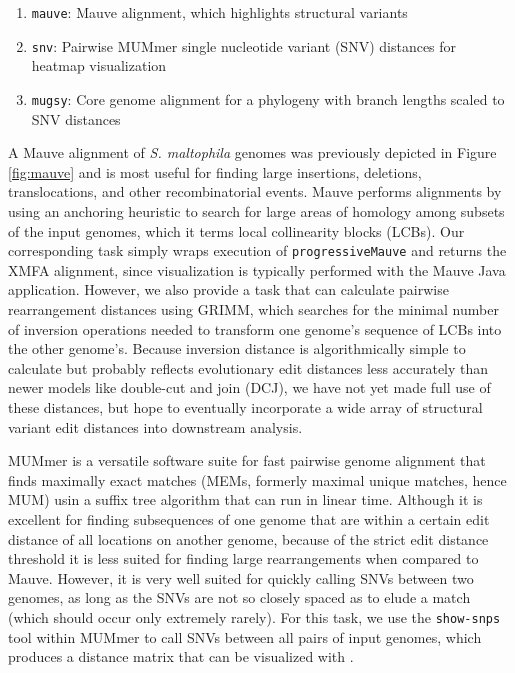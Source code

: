 \begin{enumerate}[label=\arabic*.,noitemsep,labelindent=2em,leftmargin=!]
\item \verb|mauve|: Mauve alignment, which highlights structural variants
\item \verb|snv|: Pairwise MUMmer single nucleotide variant (SNV) distances for heatmap visualization
\item \verb|mugsy|: Core genome alignment for a phylogeny with branch lengths scaled to SNV distances
\end{enumerate}

A Mauve alignment of \emph{S. maltophila} genomes was previously depicted in Figure \ref{fig:mauve} and is most useful for finding large insertions, deletions, translocations, and other recombinatorial events. Mauve performs alignments by using an anchoring heuristic to search for large areas of homology among subsets of the input genomes, which it terms local collinearity blocks (LCBs).\autocite{Darling2010} Our corresponding task simply wraps execution of \texttt{progressiveMauve}\autocite{Darling2010} and returns the XMFA alignment, since visualization is typically performed with the Mauve Java application. However, we also provide a task that can calculate pairwise rearrangement distances using GRIMM,\autocite{Tesler2002} which searches for the minimal number of inversion operations needed to transform one genome's sequence of LCBs into the other genome's. Because inversion distance is algorithmically simple to calculate\autocite{Hannenhalli1999} but probably reflects evolutionary edit distances less accurately than newer models like double-cut and join (DCJ),\autocite{Lin2008} we have not yet made full use of these distances, but hope to eventually incorporate a wide array of structural variant edit distances into downstream analysis.\autocite{Hilker2012}

MUMmer is a versatile software suite for fast pairwise genome alignment that finds maximally exact matches (MEMs, formerly maximal unique matches, hence MUM) usin a suffix tree algorithm that can run in linear time.\autocite{Kurtz2004} Although it is excellent for finding subsequences of one genome that are within a certain edit distance of all locations on another genome, because of the strict edit distance threshold it is less suited for finding large rearrangements when compared to Mauve. However, it is very well suited for quickly calling SNVs between two genomes, as long as the SNVs are not so closely spaced as to elude a match (which should occur only extremely rarely). For this task, we use the \texttt{show-snps} tool within MUMmer to call SNVs between all pairs of input genomes, which produces a distance matrix that can be visualized with \pathogendbviz.

